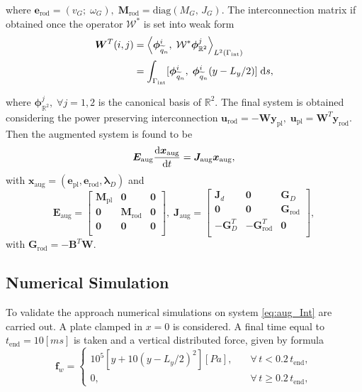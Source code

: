 \documentclass[letterpaper, 10 pt, conference]{ieeeconf}
\begin{document}
where $\bm{e}_{\text{rod}} = (v_G; \; \omega_{G}), \; \bm{M}_{\text{rod}} = \mathrm{diag}(M_G, \, J_G)$. The interconnection matrix if obtained once the operator $\mathcal{W}^*$ is set into weak form
\begin{align*}
\bm{W}^T(i,j) &= \left\langle \bm{\phi}^i_{\widetilde{q}_n}, \; \mathcal{W}^* \bm{\phi}^j_{\mathbb{R}^2} \right\rangle_{L^2(\Gamma_{\text{int}})} \\
&= \int_{\Gamma_{\text{int}}} [\bm{\phi}^i_{\widetilde{q}_n}, \; \bm{\phi}^i_{\widetilde{q}_n} (y - L_y/2) ]\d{s},
\end{align*}

where $\bm{\phi}^j_{\mathbb{R}^2},  \; \forall j = 1,2$ is the canonical basis of $\mathbb{R}^2$. The final system is obtained considering the power preserving interconnection $\bm{u}_{\text{rod}} = - \bm{W} \bm{y}_{\text{pl}}, \; \bm{u}_{\text{pl}} = \bm{W}^T \bm{y}_{\text{rod}}$. Then the augmented system is found to be
\begin{equation}
\bm{E}_{\text{aug}} \diff{\bm{x}_{\text{aug}}}{t} = \bm{J}_{\text{aug}}\bm{x}_{\text{aug}}, 
\end{equation}
with $\bm{x}_{\text{aug}} = (\bm{e}_{\text{pl}}, \bm{e}_{\text{rod}}, \bm{\lambda}_D)$ and
\begin{equation}
\label{eq:aug_Int}
\bm{E}_{\text{aug}} = 
\begin{bmatrix}
\bm{M}_{\text{pl}} & \bm{0} & \bm{0} \\
\bm{0} & \bm{M}_{\text{rod}} &\bm{0} \\
\bm{0} & \bm{0} &\bm{0} \\
\end{bmatrix}, \;
\bm{J}_{\text{aug}}=\begin{bmatrix}
\bm{J}_d & \bm{0} & \bm{G}_D \\
\bm{0} & \bm{0} & \bm{G}_{\text{rod}}\\
-\bm{G}_D^T & -\bm{G}_{\text{rod}}^T & \bm{0} \\
\end{bmatrix},
\end{equation}
with $\bm{G}_{\text{rod}} = -\bm{B}^T\bm{W}$. 
\subsection{Numerical Simulation}
To validate the approach numerical simulations on system \eqref{eq:aug_Int} are carried out. A  plate clamped in $x=0$ is considered. A final time equal to $t_{\text{end}} = 10 [ms]$ is taken and a vertical distributed force, given by formula
\begin{equation}\label{eq:force_rod}
\bm{f}_w = \begin{cases}
10^5 \left[ y + 10 \left( y - L_y/2 \right)^2 \right] [Pa], \quad &\forall \, t < 0.2 \, t_{\text{end}}, \\
0, \quad &\forall \, t \ge 0.2 \, t_{\text{end}},
\end{cases}
\end{equation}
\end{document}
